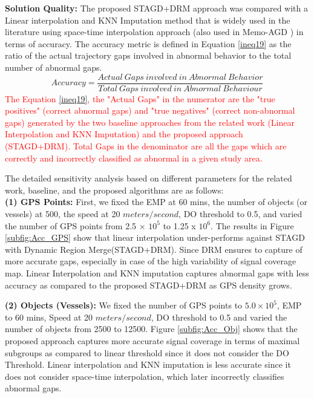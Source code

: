 \documentclass[acmsmall]{acmart}
\begin{document}
\textbf{Solution Quality:} The proposed STAGD+DRM approach was compared with a Linear interpolation and KNN Imputation method that is widely used in the literature \cite{chen2013iboat} using space-time interpolation approach (also used in Memo-AGD \cite{sharma2022abnormal}) in terms of accuracy. The accuracy metric is defined in Equation \ref{ineq19} as the ratio of the actual trajectory gaps involved in abnormal behavior to the total number of abnormal gaps.
\begin{equation}
    \label{ineq19}
    Accuracy = \frac{Actual\ Gaps\ involved\ in\ Abnormal\ Behavior}{Total\ Gaps\ involved\ in\ Abnormal\ Behaviour}
\end{equation}
\textcolor{red}{The Equation \ref{ineq19}, the "Actual Gaps" in the numerator are the "true positives" (correct abnormal gaps) and "true negatives" (correct non-abnormal gaps) generated by the two baseline approaches from the related work (Linear Interpolation and KNN Imputation) and the proposed approach (STAGD+DRM). Total Gaps in the denominator are all the gaps which are correctly and incorrectly classified as abnormal in a given study area.}

The detailed sensitivity analysis based on different parameters for the related work, baseline, and the proposed algorithms are as follows:\\

\textbf{(1) GPS Points:} First, we fixed the EMP at 60 mins, the number of objects (or vessels) at 500, the speed at 20 $meters/second$, DO threshold to 0.5, and varied the number of GPS points from 2.5 × $10^{5}$ to 1.25 x $10^{6}$. The results in Figure \ref{subfig:Acc_GPS} show that linear interpolation under-performs against STAGD with Dynamic Region Merge(STAGD+DRM). Since DRM ensures to capture of more accurate gaps, especially in case of the high variability of signal coverage map. Linear Interpolation and KNN imputation captures abnormal gaps with less accuracy as compared to the proposed STAGD+DRM as GPS density grows.

\textbf{(2) Objects (Vessels):} We fixed the number of GPS points to $5.0 \times 10^{5}$, EMP to 60 mins, Speed at 20 $meters/second$, DO threshold to 0.5 and varied the number of objects from 2500 to 12500. Figure \ref{subfig:Acc_Obj} shows that the proposed approach captures more accurate signal coverage in terms of maximal subgroups as compared to linear threshold since it does not consider the DO Threshold. Linear interpolation and KNN imputation is less accurate since it does not consider space-time interpolation, which later incorrectly classifies abnormal gaps.
\end{document}
